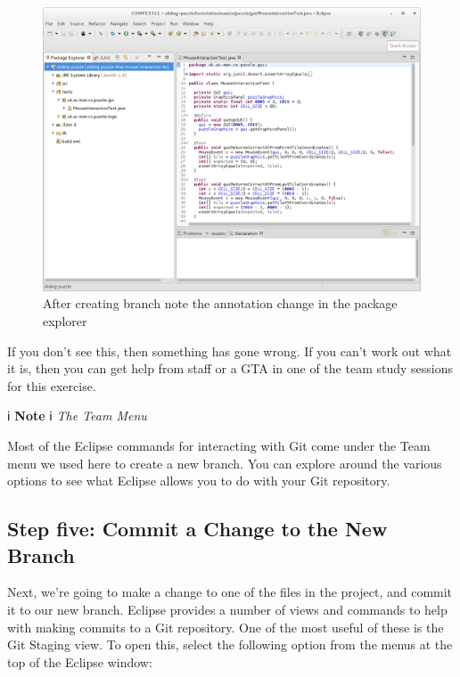 \documentclass[
]{book}
\begin{document}
\begin{figure}

{\centering \includegraphics[width=1\linewidth]{images/afterCreateBranchSeeTheAnnotationChangeInPackageExplorer} 

}

\caption{After creating branch note the annotation change in the package explorer}\label{fig:afterCreateBranchSeeTheAnnotationChangeInPackageExplorer-fig}
\end{figure}

If you don't see this, then something has gone wrong. If you can't work out what it is, then you can get help from staff or a GTA in one of the team study sessions for this exercise.

ℹ️ \textbf{Note} ℹ️
\emph{The Team Menu}

Most of the Eclipse commands for interacting with Git come under the Team menu we used here to create a new branch. You can explore around the various options to see what Eclipse allows you to do with your Git repository.

\hypertarget{commitnew}{%
\subsection{Step five: Commit a Change to the New Branch}\label{commitnew}}

Next, we're going to make a change to one of the files in the project, and commit it to our new branch. Eclipse provides a number of views and commands to help with making commits to a Git repository. One of the most useful of these is the Git Staging view. To open this, select the following option from the menus at the top of the Eclipse window:
\end{document}

